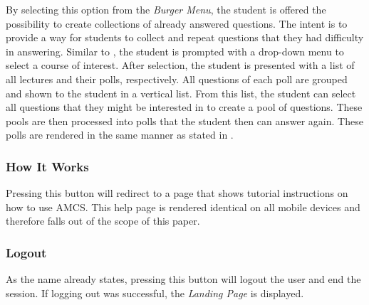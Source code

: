 By selecting this option from the \emph{Burger Menu}, the student is offered the possibility to create collections of already answered questions. The intent is to provide a way for students to collect and repeat questions that they had difficulty in answering.
Similar to \todosct, the student is prompted with a drop-down menu to select a course of interest. After selection, the student is presented with a list of all lectures and their polls, respectively. All questions of each poll are grouped and shown to the student in a vertical list. From this list, the student can select all questions that they might be interested in to create a pool of questions.
These pools are then processed into polls that the student then can answer again. These polls are rendered in the same manner as stated in .


\subsubsection{How It Works}

Pressing this button will redirect to a page that shows tutorial instructions on how to use AMCS.
This help page is rendered identical on all mobile devices and therefore falls out of the scope of this paper.

\subsubsection{Logout}

As the name already states, pressing this button will logout the user and end the session. 
If logging out was successful, the \emph{Landing Page} is displayed.


